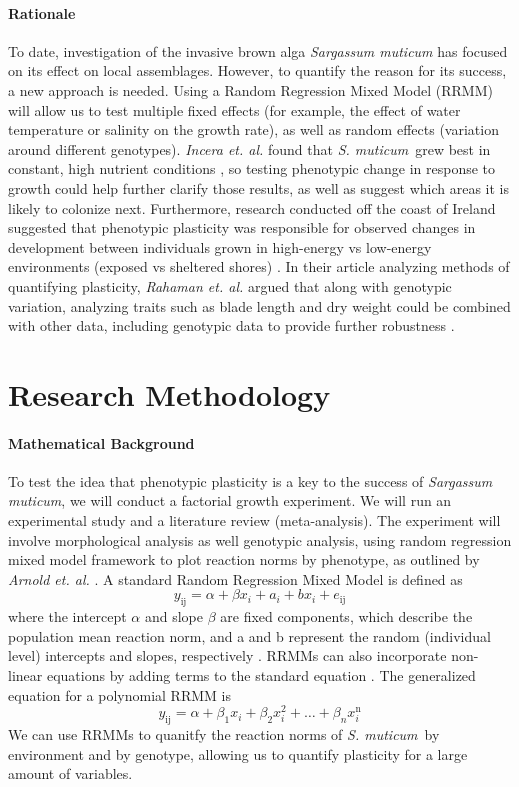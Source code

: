 \documentclass[12pt]{extarticle}
\newcommand\x{\textit{S. muticum}}
\begin{document}
\paragraph{Rationale}
To date, investigation of the invasive brown alga \textit{Sargassum muticum} has focused on its effect on local assemblages. However, to quantify the reason for its success, a new approach is needed. Using a Random Regression Mixed Model (RRMM) will allow us to test multiple fixed effects (for example, the effect of water temperature or salinity on the growth rate), as well as random effects (variation around different genotypes). \textit{Incera et. al.} found that \x\  grew best in constant, high nutrient conditions \cite{Incera2009}, so testing phenotypic change in response to growth could help further clarify those results, as well as suggest which areas it is likely to colonize next. Furthermore, research conducted off the coast of Ireland suggested that phenotypic plasticity was responsible for observed changes in development between individuals grown in high-energy vs low-energy environments (exposed vs sheltered shores) \cite{Baer2010}. In their article analyzing methods of quantifying plasticity, \textit{Rahaman et. al.} argued that along with genotypic variation, analyzing traits such as blade length and dry weight could be combined with other data, including genotypic data to provide further robustness \cite{10.3389/fpls.2015.00619}.

\section{Research Methodology}
\paragraph{Mathematical Background}
To test the idea that phenotypic plasticity is a key to the success of \textit{Sargassum muticum}, we will conduct a factorial growth experiment. We will run an experimental study and a literature review (meta-analysis). The experiment will involve morphological analysis as well genotypic analysis, using random regression mixed model framework to plot reaction norms by phenotype, as outlined by \textit{Arnold et. al.} \cite{Arnold2019}. A standard Random Regression Mixed Model is defined as 
\[y_\text{ij} = \alpha + \beta x_i + a_i + bx_i + e_\text{ij}\]
where the intercept \(\alpha\) and slope \(\beta\) are fixed components, which describe the population mean reaction norm, and a and b represent the random (individual level) intercepts and slopes, respectively \cite{Arnold2019}. RRMMs can also incorporate non-linear equations by adding terms to the standard equation \cite{Arnold2019}. The generalized equation for a polynomial RRMM is
\[y_\text{ij} = \alpha + \beta_1 x_i + \beta_2 x_i^2 + \dots + \beta_n x_i^\text{n}\]
We can use RRMMs to quanitfy the reaction norms of \x\ by environment and by genotype, allowing us to quantify plasticity for a large amount of variables.
\end{document}
